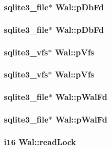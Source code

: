 \subsubsection{\setlength{\rightskip}{0pt plus 5cm}\bf{sqlite3\_\-file}$\ast$ \bf{Wal::p\-Db\-Fd}}\label{structWal_eb1eba6e19fe95f2eabd04bc76478113}


\subsubsection{\setlength{\rightskip}{0pt plus 5cm}\bf{sqlite3\_\-file}$\ast$ \bf{Wal::p\-Db\-Fd}}\label{structWal_eb1eba6e19fe95f2eabd04bc76478113}


\subsubsection{\setlength{\rightskip}{0pt plus 5cm}\bf{sqlite3\_\-vfs}$\ast$ \bf{Wal::p\-Vfs}}\label{structWal_4c1a15af9739c3502dadda3db046e2f7}


\subsubsection{\setlength{\rightskip}{0pt plus 5cm}\bf{sqlite3\_\-vfs}$\ast$ \bf{Wal::p\-Vfs}}\label{structWal_4c1a15af9739c3502dadda3db046e2f7}


\subsubsection{\setlength{\rightskip}{0pt plus 5cm}\bf{sqlite3\_\-file}$\ast$ \bf{Wal::p\-Wal\-Fd}}\label{structWal_f0a94bef81a6ec42f40ce70da6daa685}


\subsubsection{\setlength{\rightskip}{0pt plus 5cm}\bf{sqlite3\_\-file}$\ast$ \bf{Wal::p\-Wal\-Fd}}\label{structWal_f0a94bef81a6ec42f40ce70da6daa685}


\subsubsection{\setlength{\rightskip}{0pt plus 5cm}\bf{i16} \bf{Wal::read\-Lock}}\label{structWal_d259bd866bb20c30a0712c015e08a8cd}


